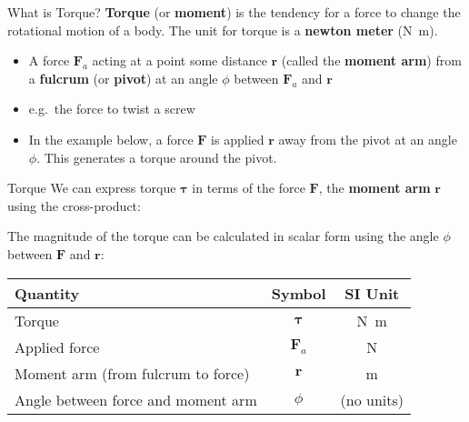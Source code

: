 \documentclass[12pt,compress,aspectratio=169]{beamer}
\begin{document}
\begin{frame}{What is Torque?}
  \textbf{Torque} (or \textbf{moment}) is the tendency for a force to change
  the rotational motion of a body. The unit for torque is a
  \textbf{newton meter} (\si{\newton\metre}).
  \begin{itemize}
  \item A force $\bm{F}_a$ acting at a point some distance $\bm{r}$ (called the
    \textbf{moment arm}) from a \textbf{fulcrum} (or \textbf{pivot}) at an angle
    $\phi$ between $\bm{F}_a$ and $\bm{r}$
  \item e.g.\ the force to twist a screw
  \item In the example below, a force $\bm{F}$ is applied $\bm{r}$ away from
    the pivot at an angle $\phi$. This generates a torque around the pivot.
  \end{itemize}
  \begin{center}
  \end{center}
\end{frame}



\begin{frame}{Torque}
  We can express torque $\bm\tau$ in terms of the force $\bm{F}$, the
  \textbf{moment arm} $\bm{r}$ using the cross-product:


  \vspace{-.1in}The magnitude of the torque can be calculated in scalar form
  using the angle $\phi$ between $\bm{F}$ and $\bm{r}$:

  \begin{center}
    \begin{tabular}{l|c|c}
      \rowcolor{pink}
      \textbf{Quantity} & \textbf{Symbol} & \textbf{SI Unit} \\ \hline
      Torque        & $\bm\tau$ & \si{\newton\metre} \\
      Applied force & $\bm{F}_a$  & \si\newton \\
      Moment arm (from fulcrum to force) & $\bm{r}$ & \si\metre \\
      Angle between force and moment arm & $\phi$ & (no units)
    \end{tabular}
  \end{center}
\end{frame}
\end{document}
